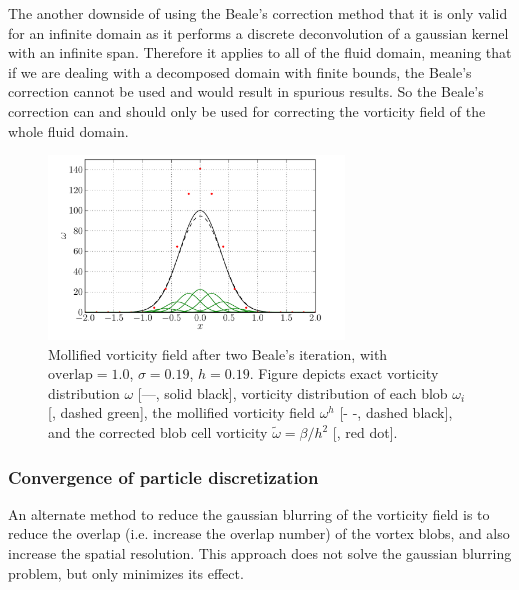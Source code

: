 The another downside of using the Beale's correction method that it is only valid for an infinite domain as it performs a discrete deconvolution of a gaussian kernel with an infinite span. Therefore it applies to all of the fluid domain, meaning that if we are dealing with a decomposed domain with finite bounds, the Beale's correction cannot be used and would result in spurious results. So the Beale's correction can and should only be used for correcting the vorticity field of the whole fluid domain.

	\begin{figure}[t]
	\centering
	\includegraphics[width=0.7\textwidth]{figures/lagrangian/bealesCorrection.pdf}
	\caption{Mollified vorticity field after two Beale's iteration, with $\mathrm{overlap}=1.0$, $\sigma=0.19$, $h=0.19$. Figure depicts exact vorticity distribution $\omega$ [---, solid black], vorticity distribution of each blob $\omega_i$ [{\color{plotGreen}{---}}, dashed green], the mollified vorticity field $\omega^h$ [- -, dashed black], and the corrected blob cell vorticity $\tilde{\omega}=\beta/h^2$ [{\color{plotRed}{$\bullet$}}, red dot].}
	\label{fig:bealesCorrection}
	\end{figure}

\subsubsection{Convergence of particle discretization}
\label{subsubsec:convergenceInterpolation}
An alternate method to reduce the gaussian blurring of the vorticity field is to reduce the overlap (i.e. increase the overlap number) of the vortex blobs, and also increase the spatial resolution. This approach does not solve the gaussian blurring problem, but only minimizes its effect.
	

